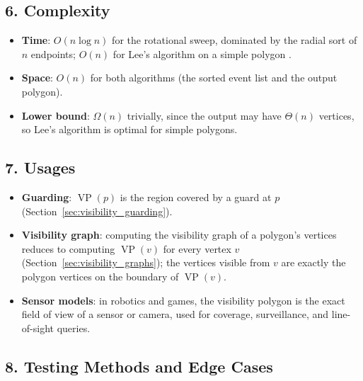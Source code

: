 \subsection{6. Complexity}

\begin{itemize}
\item \textbf{Time}: $O(n \log n)$ for the rotational sweep, dominated by
  the radial sort of $n$ endpoints; $O(n)$ for Lee's algorithm on a simple
  polygon \cite{lee1983}.
\item \textbf{Space}: $O(n)$ for both algorithms (the sorted event list and
  the output polygon).
\item \textbf{Lower bound}: $\Omega(n)$ trivially, since the output may have
  $\Theta(n)$ vertices, so Lee's algorithm is optimal for simple polygons.
\end{itemize}

\subsection{7. Usages}

\begin{itemize}
\item \textbf{Guarding}: $\operatorname{VP}(p)$ is the region covered by a
  guard at $p$ (Section~\ref{sec:visibility_guarding}).
\item \textbf{Visibility graph}: computing the visibility graph of a
  polygon's vertices reduces to computing $\operatorname{VP}(v)$ for every
  vertex $v$ (Section~\ref{sec:visibility_graphs}); the vertices visible
  from $v$ are exactly the polygon vertices on the boundary of
  $\operatorname{VP}(v)$.
\item \textbf{Sensor models}: in robotics and games, the visibility polygon
  is the exact field of view of a sensor or camera, used for coverage,
  surveillance, and line-of-sight queries.
\end{itemize}

\subsection{8. Testing Methods and Edge Cases}

